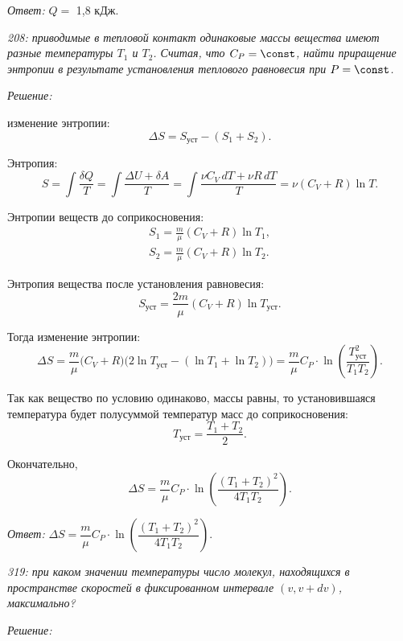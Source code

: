 \documentclass[pscyr]{hedwork}
\begin{document}
\vspace*{2em}
\emph{Ответ:} \( Q = \) 1,8 кДж.

\newpage %

\emph{208: приводимые в тепловой контакт одинаковые массы вещества имеют разные
температуры \( T_1 \) и \( T_2 \). Считая, что \( C_P = \const \), найти
приращение энтропии в результате установления теплового равновесия при
\( P = \const \).}

\vspace*{2em}
\emph{Решение:}

изменение энтропии:
\[
  \Delta S = S_\text{уст} - (S_1 + S_2).
\]

Энтропия:
\[
  S = \int\frac{\delta Q}{T} = \int\frac{\Delta U + \delta A}{T} =
    \int\frac{\nu C_V\,dT + \nu R\,dT}{T} = \nu(C_V + R)\ln T.
\]

Энтропии веществ до соприкосновения:
\begin{gather*}
  S_1 = \frac{m}{\mu}(C_V + R)\ln T_1, \\
  S_2 = \frac{m}{\mu}(C_V + R)\ln T_2.
\end{gather*}

Энтропия вещества после установления равновесия:
\[
  S_\text{уст} = \frac{2m}{\mu}(C_V + R)\ln T_\text{уст}.
\]

Тогда изменение энтропии:
\[
  \Delta S = \frac{m}{\mu}\big (C_V + R \big)\big(2\ln T_\text{уст} -
    (\ln T_1 + \ln T_2)\big) =
    \frac{m}{\mu}C_P\cdot\ln\left( \frac{T_\text{уст}^2}{T_1T_2} \right).
\]

Так как вещество по условию одинаково, массы равны, то установившаяся
температура будет полусуммой температур масс до соприкосновения:
\[
  T_\text{уст} = \frac{T_1 + T_2}{2}.
\]

Окончательно,
\[
  \Delta S = \frac{m}{\mu}C_P\cdot
    \ln\left( \frac{(T_1 + T_2)^2}{4T_1T_2} \right).
\]

\vspace*{2em}
\emph{Ответ:} \( \Delta S = \dfrac{m}{\mu}C_P\cdot
  \ln \left( \dfrac{(T_1 + T_2)^2}{4T_1T_2} \right) \).

\newpage %

\emph{319: при каком значении температуры число молекул, находящихся в
пространстве скоростей в фиксированном интервале \( (v, v + dv) \), максимально?}

\vspace*{2em}
\emph{Решение:}
\end{document}
